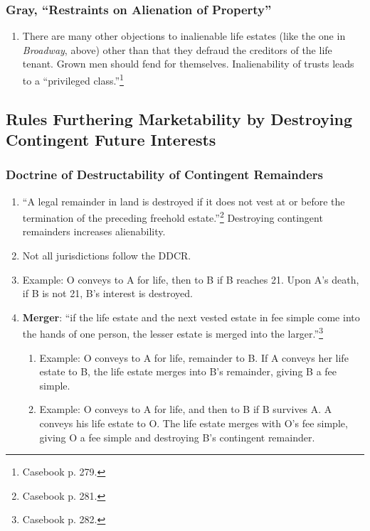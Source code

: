 \subsubsection{Gray, ``Restraints on Alienation of Property''}

\begin{enumerate}
    \item There are many other objections to inalienable life estates (like 
    the one in \emph{Broadway}, above) other than that they defraud the 
    creditors of the life tenant. Grown men should fend for themselves. 
    Inalienability of trusts leads to a ``privileged 
    class.''\footnote{Casebook p. 279.}
\end{enumerate}

\subsection{Rules Furthering Marketability by Destroying Contingent Future 
Interests}

\subsubsection{Doctrine of Destructability of Contingent Remainders}

\begin{enumerate}
    \item ``A legal remainder in land is destroyed if it does not vest at or 
    before the termination of the preceding freehold 
    estate.''\footnote{Casebook p. 281.} Destroying contingent remainders 
    increases alienability.
    \item Not all jurisdictions follow the DDCR.
    \item Example: O conveys to A for life, then to B if B reaches 21. Upon 
    A's death, if B is not 21, B's interest is destroyed.
    \item \textbf{Merger}: ``if the life estate and the next vested estate in 
    fee simple come into the hands of one person, the lesser estate is merged 
    into the larger.''\footnote{Casebook p. 282.}
    \begin{enumerate}
        \item Example: O conveys to A for life, remainder to B. If A conveys 
        her life estate to B, the life estate merges into B's remainder, 
        giving B a fee simple.
        \item Example: O conveys to A for life, and then to B if B survives A. 
        A conveys his life estate to O. The life estate merges with O's fee 
        simple, giving O a fee simple and destroying B's contingent remainder.
    \end{enumerate}
\end{enumerate}

